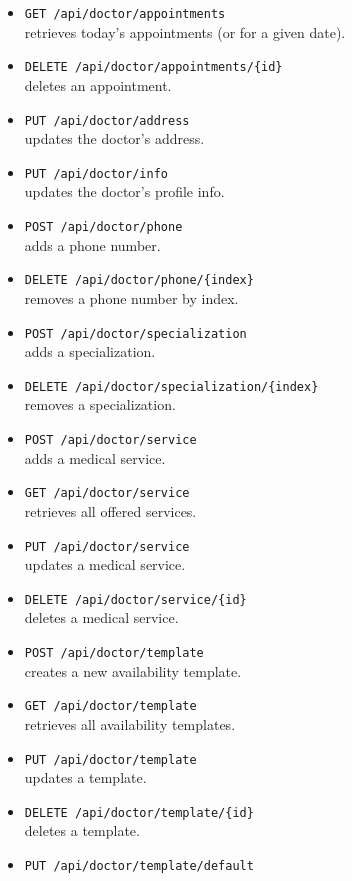 \begin{itemize}
	\item \texttt{GET /api/doctor/appointments} \\
	retrieves today's appointments (or for a given date).
	\item \texttt{DELETE /api/doctor/appointments/\{id\}} \\
	deletes an appointment.
	\item \texttt{PUT /api/doctor/address} \\
	updates the doctor's address.
	\item \texttt{PUT /api/doctor/info} \\
	updates the doctor's profile info.
	\item \texttt{POST /api/doctor/phone} \\
	adds a phone number.
	\item \texttt{DELETE /api/doctor/phone/\{index\}} \\
	removes a phone number by index.
	\item \texttt{POST /api/doctor/specialization} \\
	adds a specialization.
	\item \texttt{DELETE /api/doctor/specialization/\{index\}} \\
	removes a specialization.
	\item \texttt{POST /api/doctor/service} \\
	adds a medical service.
	\item \texttt{GET /api/doctor/service} \\
	retrieves all offered services.
	\item \texttt{PUT /api/doctor/service} \\
	updates a medical service.
	\item \texttt{DELETE /api/doctor/service/\{id\}} \\
	deletes a medical service.
	\item \texttt{POST /api/doctor/template} \\
	creates a new availability template.
	\item \texttt{GET /api/doctor/template} \\
	retrieves all availability templates.
	\item \texttt{PUT /api/doctor/template} \\
	updates a template. 
	\item \texttt{DELETE /api/doctor/template/\{id\}} \\
	deletes a template.
	\item \texttt{PUT /api/doctor/template/default} \\

\end{itemize}
